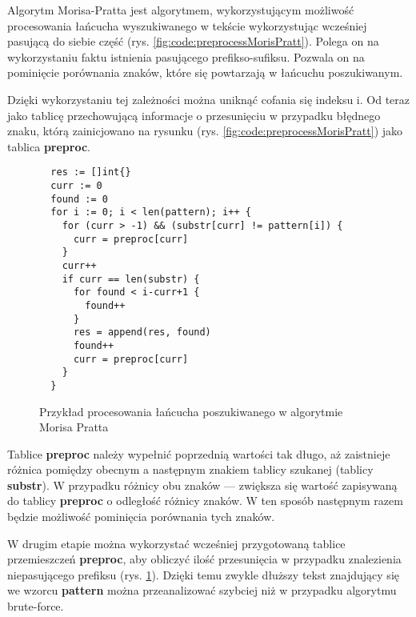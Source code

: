 Algorytm Morisa-Pratta jest algorytmem, wykorzystującym możliwość procesowania 
łańcucha wyszukiwanego w tekście wykorzystując wcześniej pasującą do siebie część
(rys. \ref{fig:code:preprocessMorisPratt}). Polega on na wykorzystaniu faktu
 istnienia pasującego prefikso-sufiksu. Pozwala on na pominięcie porównania
 znaków, które się powtarzają w łańcuchu poszukiwanym.

Dzięki wykorzystaniu tej zależności można uniknąć cofania się indeksu i. 
Od teraz jako tablicę przechowującą informacje o przesunięciu w przypadku 
błędnego znaku, którą zainicjowano na rysunku (rys. \ref{fig:code:preprocessMorisPratt})
jako tablica \textbf{preproc}.

\begin{figure}[htbp]
    \centering
    \begin{lstlisting}
  res := []int{}
  curr := 0
  found := 0
  for i := 0; i < len(pattern); i++ {
    for (curr > -1) && (substr[curr] != pattern[i]) {
      curr = preproc[curr]
    }
    curr++
    if curr == len(substr) {
      for found < i-curr+1 {
        found++
      }
      res = append(res, found)
      found++
      curr = preproc[curr]
    }
  }
    \end{lstlisting}
    \caption{Przykład procesowania łańcucha poszukiwanego w algorytmie Morisa Pratta}
    \label{fig:code:algoMorisPratt}
  \end{figure}

Tablice \textbf{preproc} należy wypełnić poprzednią wartości tak długo, aż zaistnieje
różnica pomiędzy obecnym a następnym znakiem tablicy szukanej (tablicy 
\textbf{substr}). W przypadku różnicy obu znaków — zwiększa się wartość zapisywaną 
do tablicy \textbf{preproc} o odległość różnicy znaków. W ten sposób następnym
 razem będzie możliwość pominięcia porównania tych znaków.

W drugim etapie można wykorzystać wcześniej przygotowaną tablice przemieszczeń 
\textbf{preproc}, aby obliczyć ilość przesunięcia w przypadku znalezienia 
niepasującego prefiksu (rys. \ref{fig:code:algoMorisPratt}). Dzięki temu zwykle 
dłuższy tekst znajdujący się we wzorcu \textbf{pattern} można przeanalizować szybciej
niż w przypadku algorytmu brute-force.

